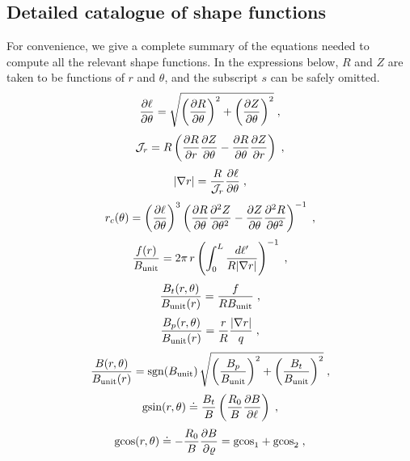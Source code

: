 \subsection{Detailed catalogue of shape functions}\label{sec.catalog}

For convenience, we give a complete summary of the 
equations needed to compute all the relevant shape functions.
In the expressions below, $R$ and $Z$ are taken to be 
functions of $r$ and $\theta$, and the subscript $s$ can be 
safely omitted. 
%
\begin{equation}
\frac{\partial\ell}{\partial\theta} = \sqrt{\left( 
  \frac{\partial R}{\partial\theta} \right)^2
+ \left( \frac{\partial Z}{\partial\theta} \right)^2} \; ,
\end{equation}
%
\begin{equation}
{\mathcal J}_r = R \left( 
 \frac{\partial R}{\partial r}\frac{\partial Z}{\partial\theta} - 
 \frac{\partial R}{\partial\theta}\frac{\partial Z}{\partial r}
\right)\; ,
\end{equation}
%
\begin{equation}
\left| \nabla r \right| = \frac{R}{{\mathcal J}_r}
  \frac{\partial\ell}{\partial\theta} \; ,
\end{equation}
%
\begin{equation}
r_c(\theta) = \left(\frac{\partial\ell}{\partial\theta}\right)^3 \left( 
\frac{\partial R}{\partial\theta}\frac{\partial^2 Z}{\partial\theta^2}-
\frac{\partial Z}{\partial\theta}\frac{\partial^2 R}{\partial\theta^2}
\right)^{-1} \; ,
\end{equation}
%
\begin{equation}
\frac{f(r)}{B_{\rm unit}} = 2\pi \, r \left( \int_0^L \frac{d\ell^\prime}{R |\nabla r|} \right)^{-1} \; , 
\end{equation}
%
\begin{equation}
\frac{B_t(r,\theta)}{B_{\rm unit}(r)} = \frac{f}{RB_{\rm unit}}\; ,
\end{equation}
%
\begin{equation}
\frac{B_p(r,\theta)}{B_{\rm unit}(r)} = \frac{r}{R}\frac{|\nabla r|}{q} \; ,
\end{equation}
%
\begin{equation}
\frac{B(r,\theta)}{B_{\rm unit}(r)} = \mathrm{sgn}(B_{\rm unit}) \, \sqrt{
 \left(\frac{B_p}{B_{\rm unit}}\right)^2+\left(\frac{B_t}{B_{\rm unit}}\right)^2} \; ,
\end{equation}
%
\begin{equation}
\text{gsin}(r,\theta) \doteq \frac{B_t}{B} 
\left(\frac{R_0}{B}\frac{\partial B}{\partial\ell}\right) \; ,
\end{equation}
%
\begin{equation}
\text{gcos}(r,\theta) \doteq -\frac{R_0}{B}\frac{\partial B}{\partial\varrho} 
= \text{gcos}_1 + \text{gcos}_2 \; , 
\end{equation} 
